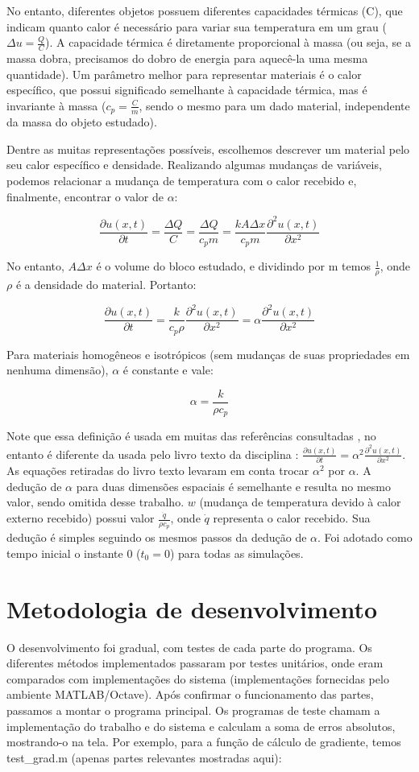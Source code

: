 \documentclass[12pt,fleqn]{article}
\begin{document}
No entanto, diferentes objetos possuem diferentes capacidades térmicas (C), que indicam quanto calor é necessário para variar sua temperatura em um grau ($\Delta u = \frac{Q}{C}$). A capacidade térmica é diretamente proporcional à massa (ou seja, se a massa dobra, precisamos do dobro de energia para aquecê-la uma mesma quantidade). Um parâmetro melhor para representar materiais é o calor específico, que possui significado semelhante à capacidade térmica, mas é invariante à massa ($c_p = \frac{C}{m}$, sendo o mesmo para um dado material, independente da massa do objeto estudado).

Dentre as muitas representações possíveis, escolhemos descrever um material pelo seu calor específico e densidade. Realizando algumas mudanças de variáveis, podemos relacionar a mudança de temperatura com o calor recebido e, finalmente, encontrar o valor de $\alpha$:

\[
\frac{\partial u(x, t)}{\partial t} = \frac{\Delta Q}{C} = \frac{\Delta Q}{c_p m} = \frac{k A \Delta x}{c_p m} \frac{\partial^2 u(x, t)}{\partial x^2}
\]

No entanto, $A \Delta x$ é o volume do bloco estudado, e dividindo por m temos $\frac{1}{\rho}$, onde $\rho$ é a densidade do material. Portanto:

\[
\frac{\partial u(x, t)}{\partial t} = \frac{k}{c_p \rho} \frac{\partial^2 u(x, t)}{\partial x^2} = \alpha \frac{\partial^2 u(x, t)}{\partial x^2}
\]

Para materiais homogêneos e isotrópicos (sem mudanças de suas propriedades em nenhuma dimensão), $\alpha$ é constante e vale:

\[\alpha = \frac{k}{\rho c_p}\]

Note que essa definição é usada em muitas das referências consultadas \cite{ufsc_geracao_de_calor} \cite{MIT}, no entanto é diferente da usada pelo livro texto da disciplina \cite{livro}: $\frac{\partial u(x, t)}{\partial t} = \alpha^2 \frac{\partial^2 u(x, t)}{\partial x^2}$. As equações retiradas do livro texto levaram em conta trocar $\alpha^2$ por $\alpha$. A dedução de $\alpha$ para duas dimensões espaciais é semelhante e resulta no mesmo valor, sendo omitida desse trabalho. $w$ (mudança de temperatura devido à calor externo recebido) possui valor $\frac{\dot q}{\rho c_p}$, onde $\dot q$ representa o calor recebido. Sua dedução é simples seguindo os mesmos passos da dedução de $\alpha$. Foi adotado como tempo inicial o instante 0 ($t_0 = 0$) para todas as simulações.

\section{Metodologia de desenvolvimento}
O desenvolvimento foi gradual, com testes de cada parte do programa. Os diferentes métodos implementados passaram por testes unitários, onde eram comparados com implementações do sistema (implementações fornecidas pelo ambiente MATLAB/Octave). Após confirmar o funcionamento das partes, passamos a montar o programa principal. Os programas de teste chamam a implementação do trabalho e do sistema e calculam a soma de erros absolutos, mostrando-o na tela. Por exemplo, para a função de cálculo de gradiente, temos test\_grad.m (apenas partes relevantes mostradas aqui):
\end{document}
